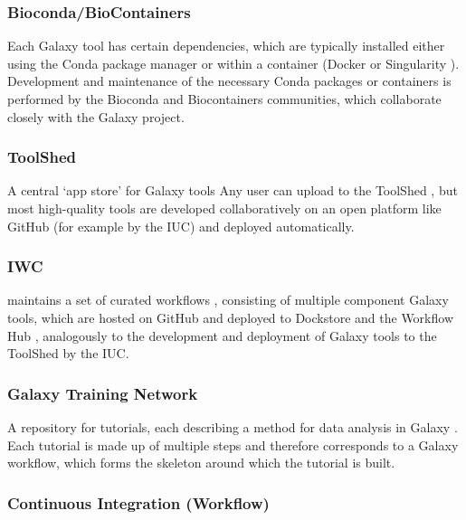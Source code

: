 \subsubsection*{Bioconda/BioContainers}

Each Galaxy tool has certain dependencies, which are typically installed
either using the Conda package manager \cite{conda_documentation_2022} or within a container
(Docker \cite{docker} or Singularity \cite{Kurtzer_2017}). Development and maintenance
of the necessary Conda packages or containers is performed by the
Bioconda and Biocontainers \cite{GalaxyProject2022} communities, which collaborate
closely with the Galaxy project.

\subsubsection*{ToolShed}

A central `app store' for Galaxy tools Any user can upload to the
ToolShed \cite{Blankenberg_2014}, but most high-quality tools are developed
collaboratively on an open platform like GitHub (for example by the IUC)
and deployed automatically.

\subsubsection*{IWC}

maintains a set of curated workflows \cite{GalaxyProject2022}, consisting of multiple
component Galaxy tools, which are hosted on GitHub and deployed to
Dockstore \cite{yuen2021dockstore} and the Workflow Hub \cite{goble2021implementing}, analogously to the
development and deployment of Galaxy tools to the ToolShed by the IUC.

\subsubsection*{Galaxy Training Network}

A repository for tutorials, each describing a method for data analysis
in Galaxy \cite{Afgan_2018}. Each tutorial is made up of multiple steps and
therefore corresponds to a Galaxy workflow, which forms the skeleton
around which the tutorial is built.

\subsubsection*{Continuous Integration (Workflow)}


